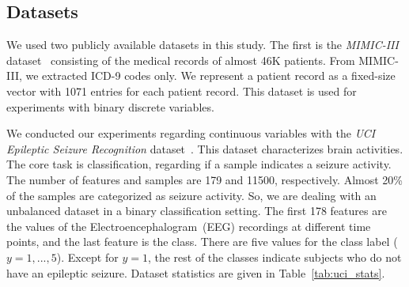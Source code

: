 \documentclass[letterpaper]{article} \usepackage{aaai20}  \usepackage{times}  \usepackage{helvet} \usepackage{courier}  \usepackage[hyphens]{url}  \usepackage{graphicx} \urlstyle{rm} \def\UrlFont{\rm}  \usepackage{graphicx}  \frenchspacing  \setlength{\pdfpagewidth}{8.5in}  \setlength{\pdfpageheight}{11in}
\begin{document}
\subsection{Datasets}\label{sec:Experimentssub:Dataset}


We used two publicly available datasets in this study.
The first is the \textit{MIMIC-III} dataset~\cite{johnson2016mimic} consisting of the medical records of almost 46K patients.
From MIMIC-III, we extracted ICD-9 codes only.
We represent a patient record as a fixed-size vector with 1071 entries for each patient record.
This dataset is used for experiments with binary discrete variables.

We conducted our experiments regarding continuous variables with the \textit{UCI Epileptic Seizure Recognition} dataset~\cite{andrzejak2001indications}.
This dataset characterizes brain activities.
The core task is classification, regarding if a sample indicates a seizure activity.
The number of features and samples are 179 and 11500, respectively.
Almost 20\% of the samples are categorized as seizure activity.
So, we are dealing with an unbalanced dataset in a binary classification setting.
The first 178 features are the values of the Electroencephalogram~(EEG) recordings at different time points, and the last feature is the class.
There are five values for the class label ($y={1,...,5}$).
Except for $y=1$, the rest of the classes indicate subjects who do not have an epileptic seizure.
Dataset statistics are given in Table~\ref{tab:uci_stats}.




\begin{table}[t]
\caption{Statistics of the UCI Epileptic Seizure Recognition dataset.}
\centering
{}
\label{tab:uci_stats}
\end{table}
\end{document}
